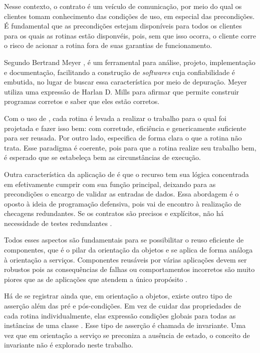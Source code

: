 Nesse contexto, o contrato é um veículo de comunicação, por meio do qual os
clientes tomam conhecimento das condições de uso, em especial das precondições.
É fundamental que as precondições estejam disponíveis para todos os clientes
para os quais as rotinas estão disponvéis, pois, sem que isso ocorra, o cliente
corre o risco de acionar a rotina fora de suas garantias de funcionamento. 

Segundo Bertrand Meyer \cite{meyer1997object}, \designbycontract{} é um
ferramental para análise, projeto, implementação e documentação, facilitando a
construção de \textit{softwares} cuja confiabilidade é embutida, no lugar de
buscar essa característica por meio de depuração. Meyer utiliza uma expressão de
Harlan D. Mills \cite{mills1975new} para afirmar que \designbycontract{} permite
construir programas corretos e saber que eles estão corretos.

Com o uso de \designbycontract{}, cada rotina é levada a realizar o trabalho
para o qual foi projetada e fazer isso bem: com corretude, eficiência e
genericamente suficiente para ser reusada. Por outro lado, especifica de forma
clara o que a rotina não trata. Esse paradigma é coerente, pois para que a
rotina realize seu trabalho bem, é esperado que se estabeleça bem as
circunstâncias de execução.

Outra característica da aplicação de \designbycontract{} é que o recurso tem sua
lógica concentrada em efetivamente cumprir com sua função principal, deixando
para as precondições o encargo de validar as entradas de dados. Essa abordagem
é o oposto à ideia de programação defensiva, pois vai de encontro à realização
de checagens redundantes. Se os contratos são precisos e explícitos, não há
necessidade de testes redundantes \cite{meyer1992applying}.

Todos esses aspectos são fundamentais para se possibilitar o reuso eficiente de
componentes, que é o pilar da orientação da objetos e se aplica de forma análoga
à orientação a serviços. Componentes reusáveis por várias aplicações devem ser
robustos pois as consequências de falhas ou comportamentos incorretos são muito
piores que as de aplicações que atendem a único propósito
\cite{meyer1992applying}.

Há de se registrar ainda que, em orientação a objetos, existe outro tipo de
asserção além das pré e pós-condições. Em vez de cuidar das propriedades de cada
rotina individualmente, elas expressão condições globais para todas as
instâncias de uma classe \cite{meyer1997object}. Esse tipo de asserção é chamada
de invariante. Uma vez que em orientação a serviço se preconiza a ausência de
estado, o conceito de invariante não é explorado neste trabalho.



